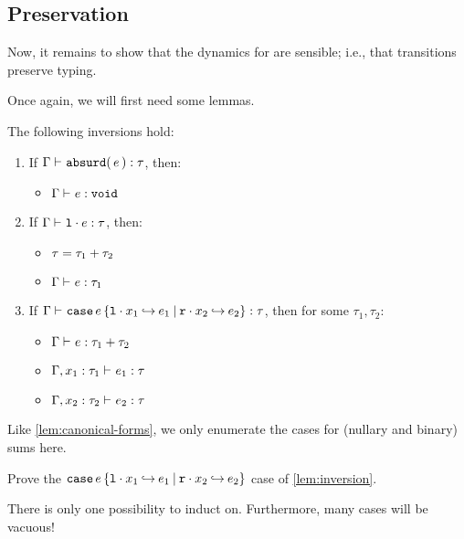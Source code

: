 \documentclass[11pt]{article}
\begin{document}
\subsection{Preservation}

Now, it remains to show that the dynamics for \LangPSF{} are sensible; i.e., that transitions preserve typing.

Once again, we will first need some lemmas.

\begin{lemma}[Inversion]\label{lem:inversion}
  The following inversions hold:
  \begin{enumerate}
    \item If $\Gamma \entails \IsOf{\absurdexcst{\tau}{e}}{\tau}$, then:
      \begin{itemize}
        \item $\Gamma \entails \IsOf{e}{\voidtycst}$
      \end{itemize}
    \item If $\Gamma \entails \IsOf{\inlexcst{\tau_2}{e}}{\tau}$, then:
      \begin{itemize}
        \item $\tau = \sumtycst{\tau_1}{\tau_2}$
        \item $\Gamma \entails \IsOf{e}{\tau_1}$
      \end{itemize}
    \item If $\Gamma \entails \IsOf{\caseexcst{e}{x_1}{\tau_1}{e_1}{x_2}{\tau_2}{e_2}}{\tau}$, then for some $\tau_1, \tau_2$:
      \begin{itemize}
        \item $\Gamma \entails \IsOf{e}{\sumtycst{\tau_1}{\tau_2}}$
        \item $\Gamma, \IsOf{x_1}{\tau_1} \entails \IsOf{e_1}{\tau}$
        \item $\Gamma, \IsOf{x_2}{\tau_2} \entails \IsOf{e_2}{\tau}$
      \end{itemize}
  \end{enumerate}
\end{lemma}
Like \cref{lem:canonical-forms}, we only enumerate the cases for (nullary and binary) sums here.

\begin{task}{10}
  Prove the $\caseexcst{e}{x_1}{\tau_1}{e_1}{x_2}{\tau_2}{e_2}$ case of \cref{lem:inversion}.
  \begin{hint}
    There is only one possibility to induct on.
    Furthermore, many cases will be vacuous!
  \end{hint}
\end{task}
\end{document}
